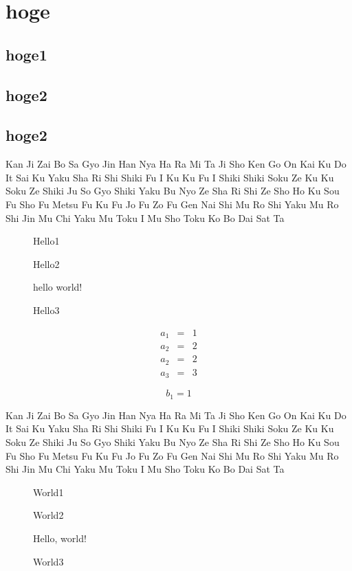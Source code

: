 \documentclass{article}
\begin{document}
\section{hoge}
\subsection{hoge1} \label{sec:hoge}
\subsection{hoge2} \label{fig:hoge}
\subsection{hoge2} \label{hoge}

Kan Ji Zai Bo Sa Gyo Jin Han Nya Ha Ra Mi Ta Ji
Sho Ken Go On Kai Ku Do It Sai Ku Yaku
Sha Ri Shi Shiki Fu I Ku Ku Fu I Shiki Shiki Soku Ze Ku Ku Soku Ze Shiki
Ju So Gyo Shiki Yaku Bu Nyo Ze
Sha Ri Shi Ze Sho Ho Ku Sou Fu Sho Fu Metsu Fu Ku Fu Jo Fu Zo Fu Gen
Nai Shi Mu Ro Shi Yaku Mu Ro Shi Jin Mu Chi Yaku Mu Toku I Mu Sho Toku Ko Bo Dai Sat Ta
\begin{figure}[h]
\begin{center}
  \caption{Hello1}
  \label{fig:hello}
  \caption{Hello2}
  \label{sec:hello}
  \caption{Hello3}
  \label{hello}
  hello world!
\end{center}
\end{figure}

\begin{eqnarray}
  a_1&=&1 \label{eq:alpha}\\
  a_2&=&2 \label{sec:alpha}\\
  a_2&=&2 \label{fig:alpha}\\
  a_3&=&3 \label{alpha}
\end{eqnarray}

\begin{equation}
  b_1=1 \label{sec:beta}
\end{equation}

\newpage

Kan Ji Zai Bo Sa Gyo Jin Han Nya Ha Ra Mi Ta Ji
Sho Ken Go On Kai Ku Do It Sai Ku Yaku
Sha Ri Shi Shiki Fu I Ku Ku Fu I Shiki Shiki Soku Ze Ku Ku Soku Ze Shiki
Ju So Gyo Shiki Yaku Bu Nyo Ze
Sha Ri Shi Ze Sho Ho Ku Sou Fu Sho Fu Metsu Fu Ku Fu Jo Fu Zo Fu Gen
Nai Shi Mu Ro Shi Yaku Mu Ro Shi Jin Mu Chi Yaku Mu Toku I Mu Sho Toku Ko Bo Dai Sat Ta
\begin{figure}[h]
\begin{center}
  \caption{World1}
  \label{fig:world}
  \caption{World2}
  \label{sec:world}
  \caption{World3}
  \label{world}
  Hello, world!
\end{center}
\end{figure}
\end{document}

